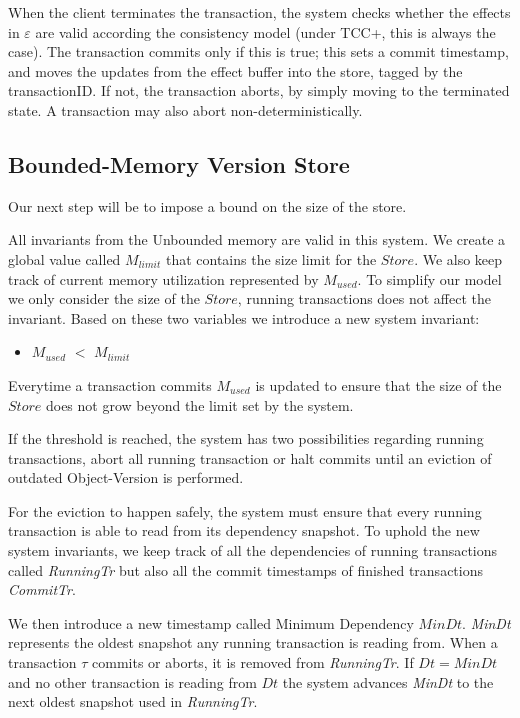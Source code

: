 \documentclass[systeme,french,english]{compas2022}
\newcommand{\commentaire}[2][fromWhom?]{%
  {%
    \color{magenta}{\bfseries\sffamily\scriptsize$\triangleright$(#1:) #2$\triangleleft$}%
  }}
\begin{document}
When the client terminates the transaction, the system checks whether
the effects in $\varepsilon$ are valid according the consistency model
(under TCC+, this is always the case).
The transaction commits only if this is true; this sets a commit
timestamp, and moves the updates
from the effect buffer into the store, tagged by the transactionID.
If not, the transaction aborts, by simply moving to the terminated
state.
A transaction may also abort non-deterministically.

\subsection{Bounded-Memory Version Store}

Our next step will be to impose a bound on the size of the store.

All invariants from the Unbounded memory are valid in this system.
We create a global value called $\mathit{M_{limit}}$ that contains the size 
limit for the $\mathit{Store}$.
We also keep track of current memory utilization represented by $\mathit{M_{used}}$.
To simplify our model we only consider the size of the $\mathit{Store}$, running transactions does not affect the invariant.
Based on these two variables we introduce a new system invariant:
\begin{itemize}
  \item \emph{$M_{used}$} $<$ \emph{$M_{limit}$}
\end{itemize}

Everytime a transaction commits $\mathit{M_{used}}$ is updated to ensure that the size of the $\mathit{Store}$ does not grow beyond the limit set by the system.

If the threshold is reached, the system has two possibilities regarding running transactions, abort all running transaction or halt commits until an eviction of outdated Object-Version is performed.

For the eviction to happen safely, the system must ensure that every running transaction is able to read from its dependency snapshot.
To uphold the new system invariants, we keep track of all the dependencies of running transactions called \emph{RunningTr} but also all the commit timestamps of finished transactions \emph{CommitTr}.

We then introduce a new timestamp called Minimum Dependency $\mathit{MinDt}$.
\emph{MinDt} represents the oldest snapshot any running transaction is reading from.
When a transaction $\tau$ commits or aborts, it is removed from \emph{RunningTr}. 
If $\mathit{Dt= MinDt}$ and no other transaction is reading from $\mathit{Dt}$ the system advances \emph{MinDt} to the next oldest snapshot used in \emph{RunningTr}.
\end{document}
